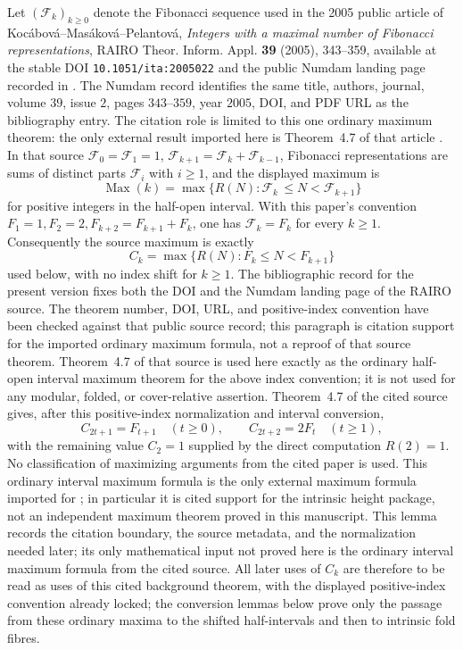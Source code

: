 \begin{lemma}
\label{lem:fibonacci-maximum-normalization-conversion}
\label{lem:positive-index-conversion-ordinary-maximum}
\label{thm:source-audited-ordinary-maximum-import}
Let \((\mathcal F_k)_{k\ge0}\) denote the Fibonacci sequence used in the 2005
public article of Koc\'abov\'a--Mas\'akov\'a--Pelantov\'a,
\emph{Integers with a maximal number of Fibonacci representations}, RAIRO
Theor. Inform. Appl. \textbf{39} (2005), 343--359, available at the stable DOI
\texttt{10.1051/ita:2005022} and the public Numdam landing page recorded in
\cite{KocabovaMasakovaPelantova2005}.  The Numdam record identifies the same
title, authors, journal, volume \(39\), issue \(2\), pages \(343\)--\(359\), year
\(2005\), DOI, and PDF URL as the bibliography entry.  The citation role is
limited to this one ordinary maximum theorem: the only external result imported
here is Theorem~4.7 of that article
\cite[Thm.~4.7]{KocabovaMasakovaPelantova2005}.
In that source
\(\mathcal F_0=\mathcal F_1=1\),
\(\mathcal F_{k+1}=\mathcal F_k+\mathcal F_{k-1}\), Fibonacci
representations are sums of distinct parts \(\mathcal F_i\) with \(i\ge1\), and
the displayed maximum is
\[
  \operatorname{Max}(k)=\max\{R(N):\mathcal F_k\,\le N<\mathcal F_{k+1}\}
\]
for positive integers in the half-open interval.  With this paper's convention
\(F_1=1,F_2=2,F_{k+2}=F_{k+1}+F_k\), one has
\(\mathcal F_k=F_k\) for every \(k\ge1\).  Consequently the source maximum is
exactly
\[
  C_k=\max\{R(N):F_k\le N<F_{k+1}\}
\]
used below, with no index shift for \(k\ge1\).
The bibliographic record for the present version fixes both the DOI and the
Numdam landing page of the RAIRO source.  The theorem number, DOI, URL, and
positive-index convention have been checked against that public source record;
this paragraph is citation support for the imported ordinary maximum formula,
not a reproof of that source theorem.  Theorem~4.7 of that source is used here
exactly as the ordinary half-open interval maximum theorem for the above index
convention; it is not used for any modular, folded, or cover-relative assertion.
Theorem~4.7 of the cited source gives, after this positive-index normalization
and interval conversion,
\[
  C_{2t+1}=F_{t+1}\quad(t\ge0),
  \qquad
  C_{2t+2}=2F_t\quad(t\ge1),
\]
with the remaining value \(C_2=1\) supplied by the direct computation
\(R(2)=1\).  No classification of maximizing arguments from the cited paper is
used.  This ordinary interval maximum formula is the only external maximum
formula imported for ; in
particular it is cited support for the intrinsic height package, not an
independent maximum theorem proved in this manuscript.  This lemma records the
citation boundary, the source metadata, and the normalization needed later; its
only mathematical input not proved here is the ordinary interval maximum formula
from the cited source.
All later uses of \(C_k\) are therefore to be read as uses of this cited
background theorem, with the displayed positive-index convention already locked;
the conversion lemmas below prove only the passage from these ordinary maxima to
the shifted half-intervals and then to intrinsic fold fibres.
\end{lemma}

